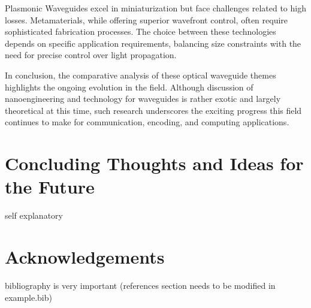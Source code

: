 \documentclass[10pt]{article}
\begin{document}
Plasmonic Waveguides excel in miniaturization but face challenges related to high losses. Metamaterials, while offering superior wavefront control, often require sophisticated fabrication processes. The choice between these technologies depends on specific application requirements, balancing size constraints with the need for precise control over light propagation.

In conclusion, the comparative analysis of these optical waveguide themes highlights the ongoing evolution in the field.
Although discussion of nanoengineering and technology for waveguides is rather exotic and largely theoretical at this time, 
such research underscores the exciting progress this field continues to make for communication, encoding, and computing applications.

\section{Concluding Thoughts and Ideas for the Future}

self explanatory 




\section{Acknowledgements}

bibliography is very important (references section needs to be modified in example.bib)

\end{document}
